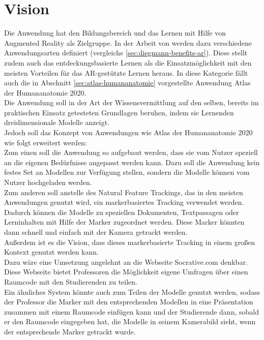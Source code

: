 \section{Vision}\label{sec:vision}
Die Anwendung hat den Bildungsbereich und das Lernen mit Hilfe von Augmented Reality als Zielgruppe. In der Arbeit von \citeauthor{diegmann:benefits-ar} werden dazu verschiedene Anwendungsarten definiert (vergleiche \ref{sec:diegmann-benefits-ar}). Diese stellt zudem auch das entdeckungsbasierte Lernen als die Einsatzmöglichkeit mit den meisten Vorteilen für das AR-gestützte Lernen heraus. In diese Kategorie fällt auch die in Abschnitt \ref{sec:atlas-humananatomie} vorgestellte Anwendung \glqq Atlas der Humananatomie 2020\grqq. \\
Die Anwendung soll in der Art der Wissensvermittlung auf den selben, bereits im praktischen Einsatz getesteten Grundlagen beruhen, indem sie Lernenden dreidimensionale Modelle anzeigt. \\
Jedoch soll das Konzept von Anwendungen wie \glqq Atlas der Humananatomie 2020\grqq{} wie folgt erweitert werden:\\
Zum einen soll die Anwendung so aufgebaut werden, dass sie vom Nutzer speziell an die eigenen Bedürfnisse angepasst werden kann. Dazu soll die Anwendung kein festes Set an Modellen zur Verfügung stellen, sondern die Modelle können vom Nutzer hochgeladen werden. \\
Zum anderen soll anstelle des Natural Feature Trackings, das in den meisten Anwendungen genutzt wird, ein markerbasiertes Tracking verwendet werden. Dadurch können die Modelle zu speziellen Dokumenten, Textpassagen oder Lerninhalten mit Hilfe der Marker zugeordnet werden. Diese Marker könnten dann schnell und einfach mit der Kamera getrackt werden.\\
Außerdem ist es die Vision, dass dieses markerbasierte Tracking in einem großen Kontext genutzt werden kann. \\
Dazu wäre eine Umsetzung angelehnt an die Webseite Socrative.com denkbar. Diese Webseite bietet Professoren die Möglichkeit eigene Umfragen über einen Raumcode mit den Studierenden zu teilen. \\
Ein ähnliches System könnte auch zum Teilen der Modelle genutzt werden, sodass der Professor die Marker mit den entsprechenden Modellen in eine Präsentation zusammen mit einem Raumcode einfügen kann und der Studierende dann, sobald er den Raumcode eingegeben hat, die Modelle in seinem Kamerabild sieht, wenn der entsprechende Marker getrackt wurde.\\
